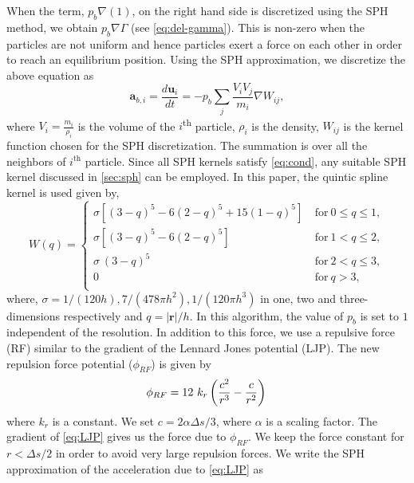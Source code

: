 \documentclass[preprint,12pt]{elsarticle}
\newcommand{\ten}[1]{\ensuremath{\mathbf{#1}}}
\begin{document}
When the term, $p_b \nabla(1)$, on the right hand side is discretized using
the SPH method, we obtain $p_b \nabla \Gamma$ (see \cref{eq:del-gamma}). This
is non-zero when the particles are not uniform and hence particles exert a
force on each other in order to reach an equilibrium position. Using the SPH
approximation, we discretize the above equation as
\begin{equation}
  \label{eq:backgrounpressure_sph}
  \ten{a}_{b,i} = \frac{d \ten{u}_i}{dt} =
  - p_b \sum_j \frac{V_i V_j}{m_i}\nabla W_{ij},
\end{equation}
where $V_i = \frac{m_i}{\rho_i}$ is the volume of the $i$\textsuperscript{th}
particle, $\rho_i$ is the density, $W_{ij}$ is the kernel function chosen for
the SPH discretization. The summation is over all the neighbors of
$i^\text{th}$ particle. Since all SPH kernels satisfy \cref{eq:cond}, any
suitable SPH kernel discussed in \cref{sec:sph} can be employed. In this
paper, the quintic spline kernel is used given by,
\begin{equation}
	\label{eq:quintic-spline}
	W(q) = \left \{
	\begin{array}{ll}
		\sigma \left[ {(3-q)}^5 - 6{(2-q)}^5 + 15{(1-q)}^5 \right] \
		& \textrm{for} \ 0\leq q \leq 1,\\
		\sigma \left[ {(3-q)}^5 - 6{(2-q)}^5 \right]
		& \textrm{for} \ 1 < q \leq 2,\\
		\sigma \ {(3-q)}^5  & \textrm{for} \ 2 < q \leq 3,\\
		0 & \textrm{for} \ q>3,\\
	\end{array} \right.
\end{equation}
where, $\sigma = 1/(120 h), 7/(478\pi h^2),1/(120\pi h^3) $ in one, two and
three-dimensions respectively and $q=|\ten{r}|/h$. In this algorithm, the
value of $p_b$ is set to $1$ independent of the resolution. In addition to
this force, we use a repulsive force (RF) similar to the gradient of the
Lennard Jones potential (LJP). The new repulsion force potential
($\phi_{RF}$) is given by
\begin{equation}
  \label{eq:LJP}
  \phi_{RF} = 12 \ k_r \left( \frac{c^2}{r^3} - \frac{c}{r^2} \right)\\
\end{equation}
where $k_r$ is a constant. We set $c = 2 \alpha \Delta s/3 $, where $\alpha$
is a scaling factor. The gradient of \cref{eq:LJP} gives us the force due to
$\phi_{RF}$.  We keep the force constant for $r<\Delta s / 2$ in order to avoid
very large repulsion forces. We write the SPH approximation of the acceleration due to \cref{eq:LJP} as
\end{document}
